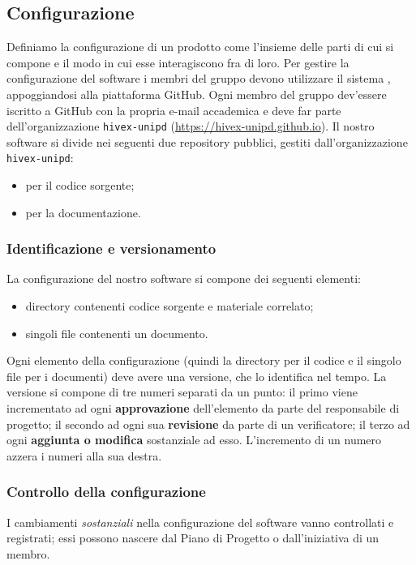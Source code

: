 \subsection{Configurazione} \label{sec:config}
Definiamo la configurazione di un prodotto come l'insieme delle parti di cui si compone e il modo in cui esse interagiscono fra di loro. Per gestire la configurazione del software i membri del gruppo devono utilizzare il sistema , appoggiandosi alla piattaforma GitHub. Ogni membro del gruppo dev'essere iscritto a GitHub con la propria e-mail accademica e deve far parte dell'organizzazione \texttt{hivex-unipd} (\url{https://hivex-unipd.github.io}). Il nostro software si divide nei seguenti due repository pubblici, gestiti dall'organizzazione \texttt{hivex-unipd}:
\begin{itemize}
	\item \repo{} per il codice sorgente;
	\item \repodoc{} per la documentazione.
\end{itemize}

\subsubsection{Identificazione e versionamento} \label{sec:idvers}
La configurazione del nostro software si compone dei seguenti elementi:
\begin{itemize}
	\item directory contenenti codice sorgente e materiale correlato;
	\item singoli file contenenti un documento.
\end{itemize}
Ogni elemento della configurazione (quindi la directory per il codice e il singolo file per i documenti) deve avere una versione, che lo identifica nel tempo. La versione si compone di tre numeri separati da un punto: il primo viene incrementato ad ogni \textbf{approvazione} dell'elemento da parte del responsabile di progetto; il secondo ad ogni sua \textbf{revisione} da parte di un verificatore; il terzo ad ogni \textbf{aggiunta o modifica} sostanziale ad esso. L'incremento di un numero azzera i numeri alla sua destra.

\subsubsection{Controllo della configurazione} I cambiamenti \emph{sostanziali} nella configurazione del software vanno controllati e registrati; essi possono nascere dal Piano di Progetto o dall'iniziativa di un membro.
